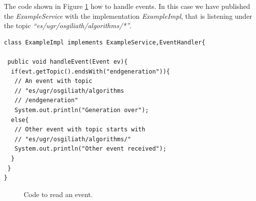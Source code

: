 The code shown in Figure \ref{fig:OSGIreadevent} how to handle events. In this case we have published the {\em ExampleService} with the implementation {\em ExampleImpl}, that is listening under the topic {\em ``es/ugr/osgiliath/algorithms/*''}.



\newsavebox{\mintedboxOSGIreadevent}
\begin{lrbox}{\mintedboxOSGIreadevent}
\begin{minipage}{10cm}
\begin{verbatim}
class ExampleImpl implements ExampleService,EventHandler{

 public void handleEvent(Event ev){
  if(evt.getTopic().endsWith("endgeneration")){
   // An event with topic 
   // "es/ugr/osgiliath/algorithms
   // /endgeneration"
   System.out.println("Generation over");
  else{
   // Other event with topic starts with
   // "es/ugr/osgiliath/algorithms/"
   System.out.println("Other event received");
  }
 }
}
\end{verbatim}
\end{minipage}
\end{lrbox}

\begin{figure}
\usebox{\mintedboxOSGIreadevent}
\caption{Code to read an event.}
\label{fig:OSGIreadevent} 
\end{figure}